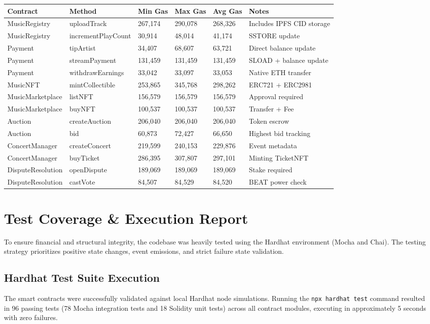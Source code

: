 \documentclass[11pt,a4paper]{article}
\begin{document}
\begin{center}
\begin{longtable}{@{}llllll@{}}
\toprule
Contract & Method & Min Gas & Max Gas & Avg Gas & Notes \\ \midrule
MusicRegistry & uploadTrack & 267,174 & 290,078 & 268,326 & Includes IPFS CID storage \\
MusicRegistry & incrementPlayCount & 30,914 & 48,014 & 41,174 & SSTORE update \\
Payment & tipArtist & 34,407 & 68,607 & 63,721 & Direct balance update \\
Payment & streamPayment & 131,459 & 131,459 & 131,459 & SLOAD + balance update \\
Payment & withdrawEarnings & 33,042 & 33,097 & 33,053 & Native ETH transfer \\
MusicNFT & mintCollectible & 253,865 & 345,768 & 298,262 & ERC721 + ERC2981 \\
MusicMarketplace & listNFT & 156,579 & 156,579 & 156,579 & Approval required \\
MusicMarketplace & buyNFT & 100,537 & 100,537 & 100,537 & Transfer + Fee \\
Auction & createAuction & 206,040 & 206,040 & 206,040 & Token escrow \\
Auction & bid & 60,873 & 72,427 & 66,650 & Highest bid tracking \\
ConcertManager & createConcert & 219,599 & 240,153 & 229,876 & Event metadata \\
ConcertManager & buyTicket & 286,395 & 307,807 & 297,101 & Minting TicketNFT \\
DisputeResolution & openDispute & 189,069 & 189,069 & 189,069 & Stake required \\
DisputeResolution & castVote & 84,507 & 84,529 & 84,520 & BEAT power check \\ \bottomrule
\end{longtable}
\end{center}

\section{Test Coverage \& Execution Report}
To ensure financial and structural integrity, the codebase was heavily tested using the Hardhat environment (Mocha and Chai). The testing strategy prioritizes positive state changes, event emissions, and strict failure state validation.

\subsection{Hardhat Test Suite Execution}
The smart contracts were successfully validated against local Hardhat node simulations. Running the \texttt{npx hardhat test} command resulted in 96 passing tests (78 Mocha integration tests and 18 Solidity unit tests) across all contract modules, executing in approximately 5 seconds with zero failures.
\end{document}
